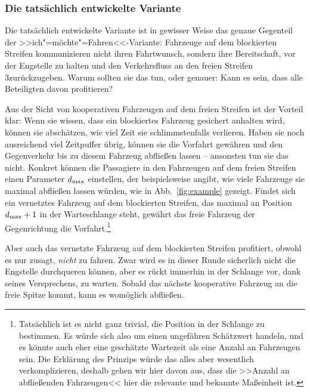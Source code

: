 \subsubsection{Die tatsächlich entwickelte Variante}\label{sec:var-proposed}


Die tatsächlich entwickelte Variante ist in gewisser Weise das genaue Gegenteil der >>ich"=möchte"=Fahren<<-Variante: Fahrzeuge auf dem blockierten Streifen kommunizieren nicht ihren Fahrtwunsch, sondern ihre Bereitschaft, %
vor der Engstelle zu halten und den Verkehrsfluss an den freien Streifen 3zurückzugeben. Warum sollten sie das tun, oder genauer: Kann es sein, dass alle Beteiligten davon profitieren?

Aus der Sicht von kooperativen Fahrzeugen auf dem freien Streifen ist der Vorteil klar: Wenn sie wissen, dass ein blockiertes Fahrzeug gesichert anhalten wird, können sie abschätzen, wie viel Zeit sie schlimmstenfalls verlieren. Haben sie noch ausreichend viel Zeitpuffer übrig, können sie die Vorfahrt gewähren und den Gegenverkehr bis zu diesem Fahrzeug abfließen lassen -- ansonsten tun sie das nicht. Konkret können die Passagiere in den Fahrzeugen auf dem freien Streifen einen Parameter ${d}_{\text{max}}$ einstellen, der beispielsweise angibt, wie viele Fahrzeuge sie maximal abfließen lassen würden, wie in Abb.~\ref{fig:example} gezeigt. Findet sich ein vernetztes Fahrzeug auf dem blockierten Streifen, das maximal an Position ${d}_{\text{max}}+1$ in der Warteschlange steht, gewährt das freie Fahrzeug der Gegenrichtung die Vorfahrt.\footnote{Tatsächlich ist es nicht ganz trivial, die Position in der Schlange zu bestimmen. Es würde sich also um einen ungefähren Schätzwert handeln, und es könnte auch eher eine geschätzte Wartezeit als eine Anzahl an Fahrzeugen sein. Die Erklärung des Prinzips würde das alles aber wesentlich verkomplizieren, deshalb gehen wir hier davon aus, dass die >>Anzahl an abfließenden Fahrzeugen<< hier die relevante und bekannte Maßeinheit ist.}

Aber auch das vernetzte Fahrzeug auf dem blockierten Streifen profitiert, obwohl es nur zusagt, \emph{nicht} zu fahren. Zwar wird es in dieser Runde sicherlich nicht die Engstelle durchqueren können, aber es rückt immerhin in der Schlange vor, dank seines Versprechens, zu warten. Sobald das nächste kooperative Fahrzeug an die freie Spitze kommt, kann es womöglich abfließen.

